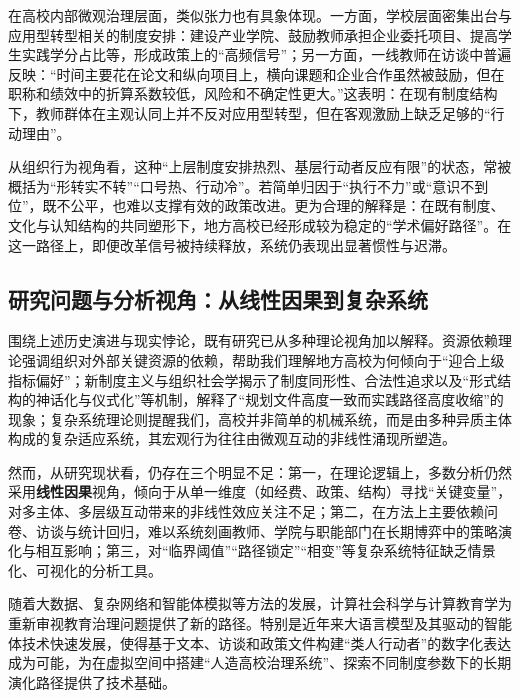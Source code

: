 \documentclass[UTF8, zihao=-4, fontset=mac]{ctexart}
\begin{document}
在高校内部微观治理层面，类似张力也有具象体现。一方面，学校层面密集出台与应用型转型相关的制度安排：建设产业学院、鼓励教师承担企业委托项目、提高学生实践学分占比等，形成政策上的“高频信号”；另一方面，一线教师在访谈中普遍反映：“时间主要花在论文和纵向项目上，横向课题和企业合作虽然被鼓励，但在职称和绩效中的折算系数较低，风险和不确定性更大。”这表明：在现有制度结构下，教师群体在主观认同上并不反对应用型转型，但在客观激励上缺乏足够的“行动理由”。

从组织行为视角看，这种“上层制度安排热烈、基层行动者反应有限”的状态，常被概括为“形转实不转”“口号热、行动冷”。若简单归因于“执行不力”或“意识不到位”，既不公平，也难以支撑有效的政策改进。更为合理的解释是：在既有制度、文化与认知结构的共同塑形下，地方高校已经形成较为稳定的“学术偏好路径”。在这一路径上，即便改革信号被持续释放，系统仍表现出显著惯性与迟滞。

\subsection{研究问题与分析视角：从线性因果到复杂系统}

围绕上述历史演进与现实悖论，既有研究已从多种理论视角加以解释。资源依赖理论强调组织对外部关键资源的依赖，帮助我们理解地方高校为何倾向于“迎合上级指标偏好”\cite{mok2005globalization}；新制度主义与组织社会学揭示了制度同形性、合法性追求以及“形式结构的神话化与仪式化”等机制，解释了“规划文件高度一致而实践路径高度收缩”的现象\cite{dimaggio1983iron, meyer1977institutionalized, weick1976educational}；复杂系统理论则提醒我们，高校并非简单的机械系统，而是由多种异质主体构成的复杂适应系统，其宏观行为往往由微观互动的非线性涌现所塑造\cite{holland1995hidden, miller2007complex}。

然而，从研究现状看，仍存在三个明显不足：第一，在理论逻辑上，多数分析仍然采用\textbf{线性因果}视角，倾向于从单一维度（如经费、政策、结构）寻找“关键变量”，对多主体、多层级互动带来的非线性效应关注不足；第二，在方法上主要依赖问卷、访谈与统计回归，难以系统刻画教师、学院与职能部门在长期博弈中的策略演化与相互影响；第三，对“临界阈值”“路径锁定”“相变”等复杂系统特征缺乏情景化、可视化的分析工具。

随着大数据、复杂网络和智能体模拟等方法的发展，计算社会科学与计算教育学为重新审视教育治理问题提供了新的路径\cite{lazer2009life, epstein2006generative, zhang2023computational}。特别是近年来大语言模型及其驱动的智能体技术快速发展，使得基于文本、访谈和政策文件构建“类人行动者”的数字化表达成为可能，为在虚拟空间中搭建“人造高校治理系统”、探索不同制度参数下的长期演化路径提供了技术基础\cite{park2023generative, hong2023metagpt, sumers2023cognitive, wang2024survey}。
\end{document}

